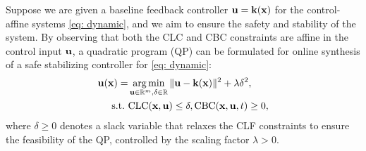 




Suppose we are given a baseline feedback controller $\mathbf{u} = \mathbf{k}(\mathbf{x})$ for the control-affine systems \eqref{eq: dynamic}, and we aim to ensure the safety and stability of the system. By observing that both the CLC and CBC constraints are affine in the control input $\mathbf{u}$, a quadratic program (QP) can be formulated for online synthesis of a safe stabilizing controller for \eqref{eq: dynamic}:
%
\begin{equation}
\begin{aligned}
\label{eq: clf_cbf_qp}
    \mathbf{u}(\mathbf{x}) = &\operatorname*{arg\,min}_{\mathbf{u} \in \mathbb{R}^m,\delta \in \mathbb{R}} \| \mathbf{u} - \mathbf{k}(\mathbf{x})\|^2 + \lambda \delta^2,  \\
    \mathrm{s.t.} \, \,  &\text{CLC}(\mathbf{x},\mathbf{u}) \leq \delta,  \text{CBC}(\mathbf{x},\mathbf{u}, t) \geq 0,
\end{aligned}
\end{equation}
%
where $\delta \geq 0$ denotes a slack variable that relaxes the CLF constraints to ensure the feasibility of the QP, controlled by the scaling factor $\lambda > 0$.
